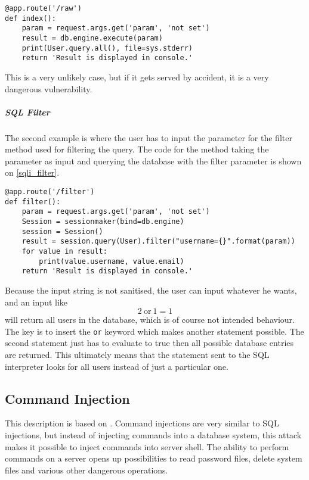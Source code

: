 \begin{lstlisting}[style={python}, deletekeywords={file, FILE}, caption={An SQL statement is taken as input and executed directly on the database}, label={sqli_naive}, firstnumber=24]
@app.route('/raw')
def index():
    param = request.args.get('param', 'not set')
    result = db.engine.execute(param)
    print(User.query.all(), file=sys.stderr)
    return 'Result is displayed in console.'
\end{lstlisting}
This is a very unlikely case, but if it gets served by accident, it is a very dangerous vulnerability.

\subparagraph{SQL Filter}
The second example is where the user has to input the parameter for the filter method used for filtering the query.
The code for the method taking the parameter as input and querying the database with the filter parameter is shown on \cref{sqli_filter}.

\begin{lstlisting}[style={python}, caption={A filter string is taken as input and used as a parameter in the filter function.}, label={sqli_filter}, firstnumber=31]
@app.route('/filter')
def filter():
    param = request.args.get('param', 'not set')
    Session = sessionmaker(bind=db.engine)
    session = Session()
    result = session.query(User).filter("username={}".format(param))
    for value in result:
        print(value.username, value.email)
    return 'Result is displayed in console.'
\end{lstlisting}

Because the input string is not sanitised, the user can input whatever he wants, and an input like
\[2 ~ \text{or} ~ 1 = 1\]
will return all users in the database, which is of course not intended behaviour.
The key is to insert the \texttt{or} keyword which makes another statement possible.
The second statement just has to evaluate to true then all possible database entries are returned.
This ultimately means that the statement sent to the SQL interpreter looks for all users instead of just a particular one.

\subsection{Command Injection}\label{vulnerabilities:ci}
This description is based on \citet{commandinjection}.
Command injections are very similar to SQL injections, but instead of injecting commands into a database system, this attack makes it possible to inject commands into server shell.
The ability to perform commands on a server opens up possibilities to read password files, delete system files and various other dangerous operations.

